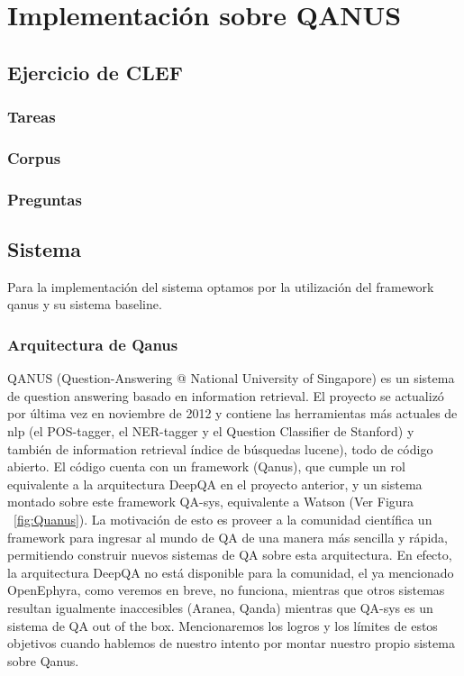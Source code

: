 \chapter{Implementación sobre QANUS}
\section{Ejercicio de CLEF}
\subsection{Tareas}
\subsection{Corpus}
\subsection{Preguntas}

\section{Sistema}
Para la implementación del sistema optamos por la utilización del framework qanus y su sistema baseline.

\subsection{Arquitectura de Qanus}

QANUS (Question-Answering @ National University of Singapore) es un
sistema de question answering basado en information retrieval. El
proyecto se actualizó por última vez en noviembre de 2012 y
contiene las herramientas más actuales de nlp (el POS-tagger, el
NER-tagger y el Question Classifier de Stanford) y también de
information retrieval índice de búsquedas lucene), todo de código
abierto. El código cuenta con un framework (Qanus), que cumple un rol
equivalente a la arquitectura DeepQA en el proyecto anterior, y un
sistema montado sobre este framework QA-sys, equivalente a Watson (Ver Figura ~\ref{fig:Quanus}). La
motivación de esto es proveer a la comunidad científica un
framework para ingresar al mundo de QA de una manera más sencilla y
rápida, permitiendo construir nuevos sistemas de QA sobre esta
arquitectura. En efecto, la arquitectura DeepQA no está disponible
para la comunidad, el ya mencionado OpenEphyra, como veremos en breve,
no funciona, mientras que otros sistemas resultan igualmente
inaccesibles (Aranea, Qanda) mientras que QA-sys es un sistema de QA
out of the box. Mencionaremos los logros y los límites de estos
objetivos cuando hablemos de nuestro intento por montar nuestro propio
sistema sobre Qanus. 

